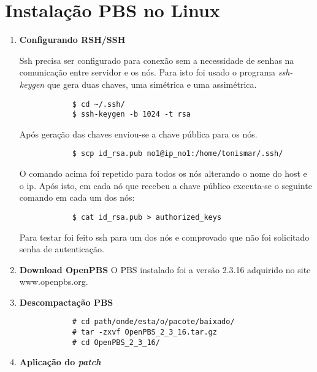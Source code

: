 \chapter{Instalação PBS no Linux}
\label{anexo:pbs-linux}

\begin{enumerate}
	\item \textbf{Configurando RSH/SSH}
	
		Ssh precisa ser configurado para conexão sem a necessidade de senhas na comunicação entre servidor e os nós. Para isto foi usado o programa \emph{ssh-keygen} que gera duas chaves, uma simétrica e uma assimétrica. 
		\begin{scriptsize}
		\begin{verbatim}
			$ cd ~/.ssh/
			$ ssh-keygen -b 1024 -t rsa		
		\end{verbatim}
		\end{scriptsize}
		Após geração das chaves enviou-se a chave pública para os nós.
		\begin{scriptsize}
		\begin{verbatim}
			$ scp id_rsa.pub no1@ip_no1:/home/tonismar/.ssh/
		\end{verbatim}		
		\end{scriptsize}			
		O comando acima foi repetido para todos os nós alterando o nome do host e o ip.
		Após isto, em cada nó que recebeu a chave público executa-se o seguinte comando em cada um dos nós:
		\begin{scriptsize}
		\begin{verbatim}
			$ cat id_rsa.pub > authorized_keys
		\end{verbatim}
		\end{scriptsize}
		Para testar foi feito ssh para um dos nós e comprovado que não foi solicitado senha de autenticação.
	
	\item \textbf{Download OpenPBS}
		O PBS instalado foi a versão 2.3.16 adquirido no site www.openpbs.org.
		
	\item \textbf{Descompactação PBS}
		
		\begin{scriptsize}
		\begin{verbatim}
			# cd path/onde/esta/o/pacote/baixado/
			# tar -zxvf OpenPBS_2_3_16.tar.gz
			# cd OpenPBS_2_3_16/
		\end{verbatim}
		\end{scriptsize}	
		
	\item \textbf{Aplicação do \emph{patch}}
		

\end{enumerate}
